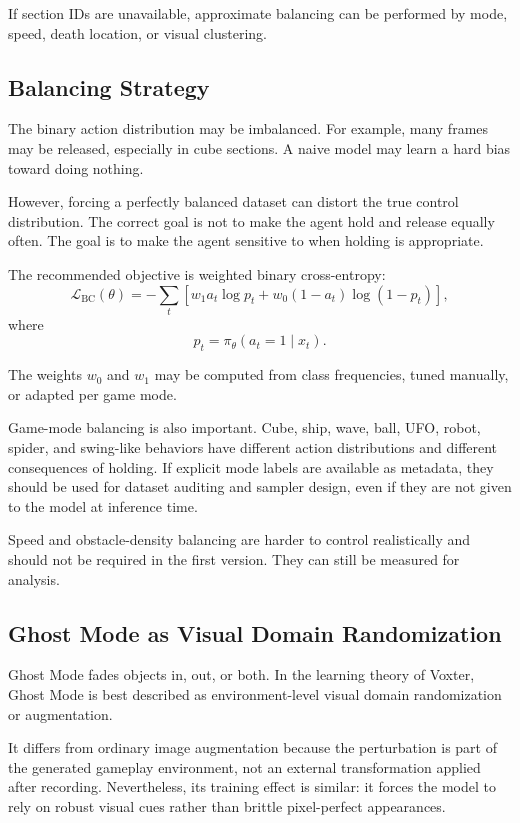 \documentclass[11pt]{article}
\newcommand{\BC}{\mathrm{BC}}
\begin{document}
If section IDs are unavailable, approximate balancing can be performed by mode, speed, death location, or visual clustering.

\subsection{Balancing Strategy}

The binary action distribution may be imbalanced. For example, many frames may be released, especially in cube sections. A naive model may learn a hard bias toward doing nothing.

However, forcing a perfectly balanced dataset can distort the true control distribution. The correct goal is not to make the agent hold and release equally often. The goal is to make the agent sensitive to when holding is appropriate.

The recommended objective is weighted binary cross-entropy:
\[
  \mathcal{L}_{\BC}(\theta)
  =
  -\sum_t
  \left[
    w_1 a_t \log p_t
    +
    w_0(1-a_t)\log(1-p_t)
  \right],
\]
where
\[
  p_t = \pi_\theta(a_t=1 \mid x_t).
\]

The weights \(w_0\) and \(w_1\) may be computed from class frequencies, tuned manually, or adapted per game mode.

Game-mode balancing is also important. Cube, ship, wave, ball, UFO, robot, spider, and swing-like behaviors have different action distributions and different consequences of holding. If explicit mode labels are available as metadata, they should be used for dataset auditing and sampler design, even if they are not given to the model at inference time.

Speed and obstacle-density balancing are harder to control realistically and should not be required in the first version. They can still be measured for analysis.

\subsection{Ghost Mode as Visual Domain Randomization}

Ghost Mode fades objects in, out, or both. In the learning theory of Voxter, Ghost Mode is best described as environment-level visual domain randomization or augmentation.

It differs from ordinary image augmentation because the perturbation is part of the generated gameplay environment, not an external transformation applied after recording. Nevertheless, its training effect is similar: it forces the model to rely on robust visual cues rather than brittle pixel-perfect appearances.
\end{document}
